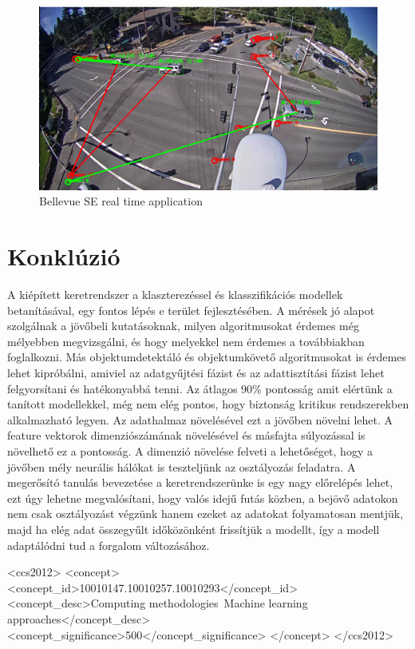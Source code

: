 \documentclass[acmtog, authorversion]{acmart}
\begin{document}
\begin{figure}[H]
    \includegraphics[width=1\columnwidth]{visualization/bellevue_se.png}
    \caption{Bellevue SE real time application}
    \label{fig: BellevueSERealTime}
\end{figure}

\section{Konklúzió}
A kiépített keretrendszer a klaszterezéssel és klasszifikációs modellek betanításával, egy fontos lépés e terület fejlesztésében. A mérések jó alapot szolgálnak a jövőbeli kutatásoknak, milyen algoritmusokat érdemes még mélyebben megvizsgálni, és hogy melyekkel nem érdemes a továbbiakban foglalkozni. Más objektumdetektáló és objektumkövető algoritmusokat is érdemes lehet kipróbálni, amiviel az adatgyűjtési fázist és az adattisztítási fázist lehet felgyorsítani és hatékonyabbá tenni.
Az átlagos 90\% pontosság amit elértünk a tanított modellekkel, még nem elég pontos, hogy biztonság kritikus rendszerekben alkalmazható legyen. Az adathalmaz növelésével ezt a jövőben növelni lehet. A feature vektorok dimenziószámának növelésével és másfajta súlyozással is növelhető ez a pontosság. A dimenzió növelése felveti a lehetőséget, hogy a jövőben mély neurális hálókat is teszteljünk az osztályozás feladatra.
A megerősító tanulás bevezetése a keretrendszerünke is egy nagy előrelépés lehet, ezt úgy lehetne megvalósítani, hogy valós idejű futás közben, a bejövő adatokon nem csak osztályozást végzünk hanem ezeket az adatokat folyamatosan mentjük, majd ha elég adat összegyűlt időközönként frissítjük a modellt, így a modell adaptálódni tud a forgalom változásához. 




\begin{CCSXML}
    <ccs2012>
        <concept>
            <concept_id>10010147.10010257.10010293</concept_id>
            <concept_desc>Computing methodologies~Machine learning approaches</concept_desc>
            <concept_significance>500</concept_significance>
            </concept>
    </ccs2012>
\end{CCSXML}
\end{document}
